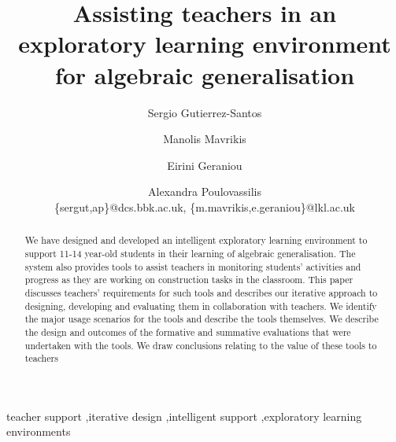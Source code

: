 \documentclass[authoryear,preprint,12pt]{elsarticle}
\begin{document}
\begin{frontmatter}



\title{Assisting teachers in an exploratory learning environment
  for algebraic generalisation} 



\author{Sergio Gutierrez-Santos \and Manolis Mavrikis \and Eirini
  Geraniou \and Alexandra Poulovassilis \\ 
  \{sergut,ap\}@dcs.bbk.ac.uk, \{m.mavrikis,e.geraniou\}@lkl.ac.uk}

\address{London Knowledge Lab} 

\begin{abstract}
We have designed and developed an intelligent exploratory learning
environment to support 11-14 year-old students in their learning of
algebraic generalisation. The system also provides tools to assist
teachers in monitoring students' activities and progress as they are
working on construction tasks in the classroom. This paper discusses
teachers’ requirements for such tools and describes our iterative
approach to designing, developing and evaluating them in collaboration
with teachers. We identify the major usage scenarios for the tools and
describe the tools themselves. We describe the design and outcomes of
the formative and summative evaluations that were undertaken with the
tools. We draw conclusions relating to the value of these tools to
teachers 
\end{abstract}

\begin{keyword}
     teacher support 
\sep iterative design 
\sep intelligent support 
\sep exploratory learning environments
\end{keyword}

\end{frontmatter}
\end{document}
